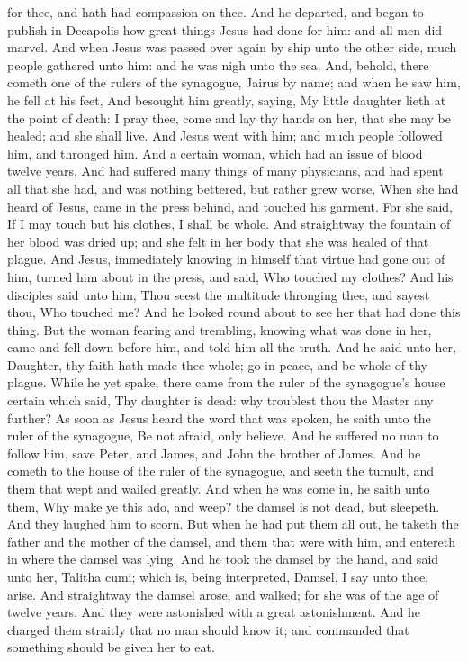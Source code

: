 for thee, and hath had compassion on thee.  And he
departed, and began to publish in Decapolis how great things Jesus had
done for him: and all men did marvel.  And when Jesus was
passed over again by ship unto the other side, much people gathered unto
him: and he was nigh unto the sea.  And, behold, there
cometh one of the rulers of the synagogue, Jairus by name; and when he
saw him, he fell at his feet,  And besought him greatly,
saying, My little daughter lieth at the point of death: I pray thee,
come and lay thy hands on her, that she may be healed; and she shall
live.  And Jesus went with him; and much people followed
him, and thronged him.  And a certain woman, which had an
issue of blood twelve years,  And had suffered many things
of many physicians, and had spent all that she had, and was nothing
bettered, but rather grew worse,  When she had heard of
Jesus, came in the press behind, and touched his garment. 
For she said, If I may touch but his clothes, I shall be whole.
 And straightway the fountain of her blood was dried up;
and she felt in her body that she was healed of that plague.
 And Jesus, immediately knowing in himself that virtue had
gone out of him, turned him about in the press, and said, Who touched my
clothes?  And his disciples said unto him, Thou seest the
multitude thronging thee, and sayest thou, Who touched me? 
And he looked round about to see her that had done this thing.
 But the woman fearing and trembling, knowing what was done
in her, came and fell down before him, and told him all the truth.
 And he said unto her, Daughter, thy faith hath made thee
whole; go in peace, and be whole of thy plague.  While he
yet spake, there came from the ruler of the synagogue's house certain
which said, Thy daughter is dead: why troublest thou the Master any
further?  As soon as Jesus heard the word that was spoken,
he saith unto the ruler of the synagogue, Be not afraid, only believe.
 And he suffered no man to follow him, save Peter, and
James, and John the brother of James.  And he cometh to the
house of the ruler of the synagogue, and seeth the tumult, and them that
wept and wailed greatly.  And when he was come in, he saith
unto them, Why make ye this ado, and weep? the damsel is not dead, but
sleepeth.  And they laughed him to scorn. But when he had
put them all out, he taketh the father and the mother of the damsel, and
them that were with him, and entereth in where the damsel was lying.
 And he took the damsel by the hand, and said unto her,
Talitha cumi; which is, being interpreted, Damsel, I say unto thee,
arise.  And straightway the damsel arose, and walked; for
she was of the age of twelve years. And they were astonished with a
great astonishment.  And he charged them straitly that no
man should know it; and commanded that something should be given her to
eat.

